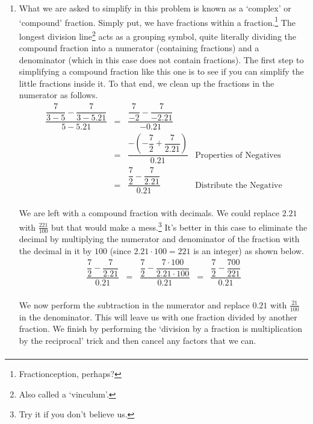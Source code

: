 \begin{ex}
\begin{enumerate}
\item What we are asked to simplify in this problem is known as a  `complex' or `compound' fraction.  Simply put, we have fractions within a fraction.\footnote{Fractionception, perhaps?}  The longest division line\footnote{Also called a `vinculum'.} acts as a grouping symbol, quite literally dividing the compound fraction into a numerator (containing fractions) and a denominator (which in this case does not contain fractions).  The first step to simplifying a compound fraction like this one is to see if you can simplify the little fractions inside it.  To that end, we clean up the fractions in the numerator as follows.\[ \begin{array}{rclr}

 \dfrac{\dfrac{7}{3-5} - \dfrac{7}{3-5.21}}{5-5.21} & = & \dfrac{\dfrac{7}{-2} - \dfrac{7}{-2.21}}{-0.21} & \\ [10pt]
                                                    & = & \dfrac{-\left(-\dfrac{7}{2} + \dfrac{7}{2.21}\right)}{0.21} & \text{Properties of Negatives} \\ [10pt]
																										& = & \dfrac{\dfrac{7}{2} - \dfrac{7}{2.21}}{0.21} & \text{Distribute the Negative} \\ \end{array}\]
																										
We are left with a compound fraction with decimals.  We could replace $2.21$ with $\frac{221}{100}$ but that would make a mess.\footnote{Try it if you don't believe us.}  It's better in this case to eliminate the decimal by multiplying the numerator and denominator of the fraction with the decimal in it by $100$ (since $2.21 \cdot 100 = 221$ is an integer) as shown below.\[ \begin{array}{rclcl}

\dfrac{\dfrac{7}{2} - \dfrac{7}{2.21}}{0.21} & = & \dfrac{ \dfrac{7}{2} - \dfrac{7 \cdot 100}{2.21 \cdot 100}}{0.21} & = & \dfrac{\dfrac{7}{2} - \dfrac{700}{221}}{0.21}\\ \end{array}\]

We now perform the subtraction in the numerator and replace $0.21$ with $\frac{21}{100}$ in the denominator.  This will leave us with one fraction divided by another fraction.  We finish by performing the `division by a fraction is multiplication by the reciprocal' trick and then cancel any factors that we can.\[ \begin{array}{rclcl}
																										

\end{array}\]
\end{enumerate}
\end{ex}
